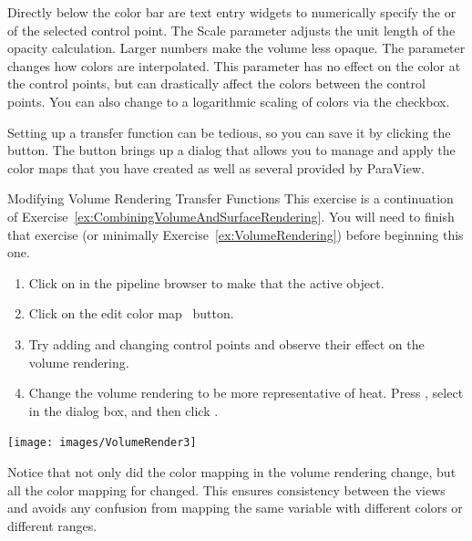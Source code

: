 Directly below the color bar are text entry widgets to numerically specify
the  or  of the selected
control point.  The Scale parameter adjusts the unit length of the opacity
calculation.  Larger numbers make the volume less opaque.  The  parameter changes how colors are interpolated.
This parameter has no effect on the color at the control points, but can
drastically affect the colors between the control points.  You can also
change to a logarithmic scaling of colors via the  checkbox.

Setting up a transfer function can be tedious, so you can save it by
clicking the  button.  The
 button brings up a
dialog that allows you to manage and apply the color maps that you have
created as well as several provided by ParaView.

\begin{exercise}{Modifying Volume Rendering Transfer Functions}
  \label{ex:ModifyingVolumeRenderingTransferFunctions}%
  This exercise is a continuation of
  Exercise~\ref{ex:CombiningVolumeAndSurfaceRendering}.  You will need to
  finish that exercise (or minimally Exercise~\ref{ex:VolumeRendering})
  before beginning this one.

  \begin{enumerate}
  \item Click on  in the pipeline browser to make
    that the active object.
  \item Click on the edit color map~ button.
  \item Try adding and changing control points and observe their effect on
    the volume rendering.
  \item Change the volume rendering to be more representative of heat.
    Press , select
     in the dialog box, and then click .
  \end{enumerate}

  \begin{inlinefig}
    \texttt{[image: images/VolumeRender3]}
  \end{inlinefig}

  Notice that not only did the color mapping in the volume rendering
  change, but all the color mapping for  changed.  This ensures
  consistency between the views and avoids any confusion from mapping the
  same variable with different colors or different ranges.
\end{exercise}


